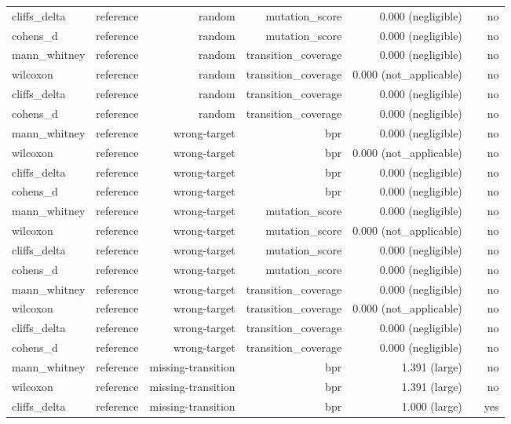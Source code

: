 \begin{table}[t]
\begin{tabular}{lrrrrrr}
cliffs\_delta & reference & random & mutation\_score & 0.000 (negligible) &  & no \\
cohens\_d & reference & random & mutation\_score & 0.000 (negligible) &  & no \\
mann\_whitney & reference & random & transition\_coverage & 0.000 (negligible) &  & no \\
wilcoxon & reference & random & transition\_coverage & 0.000 (not\_applicable) &  & no \\
cliffs\_delta & reference & random & transition\_coverage & 0.000 (negligible) &  & no \\
cohens\_d & reference & random & transition\_coverage & 0.000 (negligible) &  & no \\
mann\_whitney & reference & wrong-target & bpr & 0.000 (negligible) &  & no \\
wilcoxon & reference & wrong-target & bpr & 0.000 (not\_applicable) &  & no \\
cliffs\_delta & reference & wrong-target & bpr & 0.000 (negligible) &  & no \\
cohens\_d & reference & wrong-target & bpr & 0.000 (negligible) &  & no \\
mann\_whitney & reference & wrong-target & mutation\_score & 0.000 (negligible) &  & no \\
wilcoxon & reference & wrong-target & mutation\_score & 0.000 (not\_applicable) &  & no \\
cliffs\_delta & reference & wrong-target & mutation\_score & 0.000 (negligible) &  & no \\
cohens\_d & reference & wrong-target & mutation\_score & 0.000 (negligible) &  & no \\
mann\_whitney & reference & wrong-target & transition\_coverage & 0.000 (negligible) &  & no \\
wilcoxon & reference & wrong-target & transition\_coverage & 0.000 (not\_applicable) &  & no \\
cliffs\_delta & reference & wrong-target & transition\_coverage & 0.000 (negligible) &  & no \\
cohens\_d & reference & wrong-target & transition\_coverage & 0.000 (negligible) &  & no \\
mann\_whitney & reference & missing-transition & bpr & 1.391 (large) &  & no \\
wilcoxon & reference & missing-transition & bpr & 1.391 (large) &  & no \\
cliffs\_delta & reference & missing-transition & bpr & 1.000 (large) &  & yes \\

\end{tabular}
\end{table}
